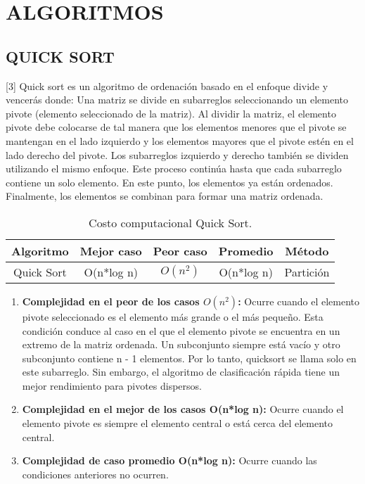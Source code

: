 \documentclass{article}
\begin{document}

\section{ALGORITMOS}
\subsection{QUICK SORT}
[3] Quick sort es un algoritmo de ordenación basado en el enfoque divide y vencerás donde: Una matriz se divide en subarreglos seleccionando un elemento pivote (elemento seleccionado de la matriz). Al dividir la matriz, el elemento pivote debe colocarse de tal manera que los elementos menores que el pivote se mantengan en el lado izquierdo y los elementos mayores que el pivote estén en el lado derecho del pivote. Los subarreglos izquierdo y derecho también se dividen utilizando el mismo enfoque. Este proceso continúa hasta que cada subarreglo contiene un solo elemento. En este punto, los elementos ya están ordenados. Finalmente, los elementos se combinan para formar una matriz ordenada.

    \begin{table}[h!]
        \centering
        \begin{tabular}{||c c c c c||} 
         \hline
         \textbf{Algoritmo} & \textbf{Mejor caso} & \textbf{Peor caso} & \textbf{Promedio} & \textbf{Método} \\ [0.5ex] 
         \hline\hline
         Quick Sort & O(n*log n) & \(O(n^2)\) & O(n*log n) & Partición \\ [0.5ex] 
         \hline
        \end{tabular}
        \caption{Costo computacional Quick Sort.}
        \label{table:dataQuickSort}
    \end{table}

    \begin{enumerate}
        \item \textbf{Complejidad en el peor de los casos \(O(n^2)\):} Ocurre cuando el elemento pivote seleccionado es el elemento más grande o el más pequeño. Esta condición conduce al caso en el que el elemento pivote se encuentra en un extremo de la matriz ordenada. Un subconjunto siempre está vacío y otro subconjunto contiene n - 1 elementos. Por lo tanto, quicksort se llama solo en este subarreglo. Sin embargo, el algoritmo de clasificación rápida tiene un mejor rendimiento para pivotes dispersos.
        
        \item \textbf{Complejidad en el mejor de los casos O(n*log n):} Ocurre cuando el elemento pivote es siempre el elemento central o está cerca del elemento central.
        
        \item \textbf{Complejidad de caso promedio O(n*log n):} Ocurre cuando las condiciones anteriores no ocurren.
    \end{enumerate}
        
\end{document}
